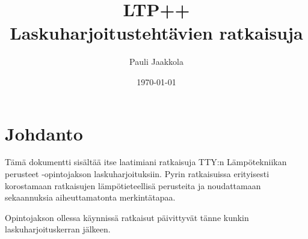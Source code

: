 \documentclass[12pt,a4paper,finnish]{book}
\title{LTP++\\Laskuharjoitustehtävien ratkaisuja}
\date{\today}
\author{Pauli Jaakkola}
\begin{document}
\maketitle
\newpage
{}
\tableofcontents
\newpage
{}

\chapter{Johdanto}

Tämä dokumentti sisältää itse laatimiani ratkaisuja TTY:n Lämpötekniikan perusteet -opintojakson laskuharjoituksiin.
Pyrin ratkaisuissa erityisesti korostamaan ratkaisujen lämpötieteellisä perusteita ja noudattamaan sekaannuksia 
aiheuttamatonta merkintätapaa.

Opintojakson ollessa käynnissä ratkaisut päivittyvät tänne kunkin laskuharjoituskerran jälkeen. 
\end{document}
